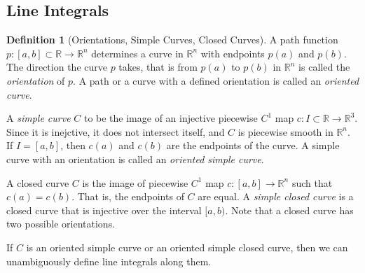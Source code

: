 \documentclass{article}
\theoremstyle{remark}
\theoremstyle{definition}
\newtheorem{definition}{Definition}[section]
\begin{document}
\subsection{Line Integrals}
\begin{definition}[Orientations, Simple Curves, Closed Curves]
A path function $p: [a,b]\subset \mathbb{R} \longrightarrow \mathbb{R}^n$ determines a curve in $\mathbb{R}^n$ with endpoints $p(a)$ and $p(b)$. The direction the curve $p$ takes, that is from $p(a)$ to $p(b)$ in $\mathbb{R}^n$ is called the \textit{orientation} of $p$. A path or a curve with a defined orientation is called an \textit{oriented curve}. 

A \textit{simple curve} $C$ to be the image of an injective piecewise $C^1$ map $c: I \subset \mathbb{R} \longrightarrow \mathbb{R}^3$. Since it is inejctive, it does not intersect itself, and $C$ is piecewise smooth in $\mathbb{R}^n$. If $I = [a,b]$, then $c(a)$ and $c(b)$ are the endpoints of the curve. A simple curve with an orientation is called an \textit{oriented simple curve}. 

A closed curve $C$ is the image of piecewise $C^1$ map $c: [a,b] \longrightarrow \mathbb{R}^n$ such that $c(a) = c(b)$. That is, the endpoints of $C$ are equal. A \textit{simple closed curve} is a closed curve that is injective over the interval $[a,b)$. Note that a closed curve has two possible orientations. 
\end{definition}

If $C$ is an oriented simple curve or an oriented simple closed curve, then we can unambiguously define line integrals along them. 
\end{document}
